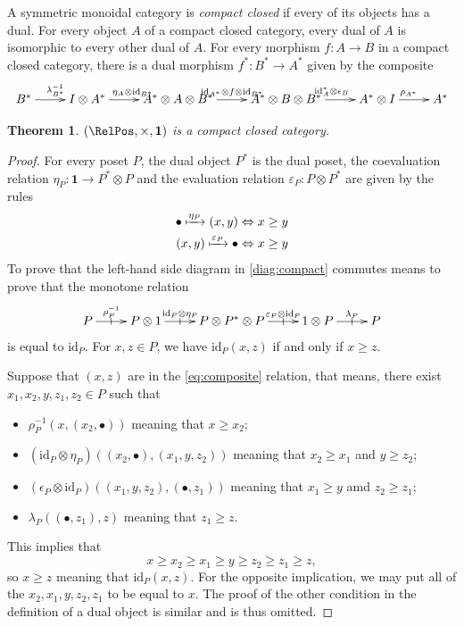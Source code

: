 \documentclass{article}
\makeatletter
\newtheorem{theorem}{Theorem}[section]
\theoremstyle{definition}
\newcommand{\id}{\mathrm{id}}
\newcommand{\sar}[2]{\ar[#1]|-@{|}^-{#2}}
\makeatother
\begin{document}
A symmetric monoidal category is {\em compact closed}
if every of its objects has a dual. For every object $A$ of a compact closed
category, every dual of $A$ is isomorphic to every other dual of $A$.
For every morphism $f\colon A\to B$ in
a compact closed category, there is a dual morphism $f^*\colon B^*\to A^*$
given by the composite
$$
\xymatrix{
B^*
	\ar[r]^{\lambda_{B^*}^{-1}}
&
I\otimes A^*
	\ar[r]^{\eta_A\otimes\id_{B^*}}
&
A^*\otimes A\otimes B^*
	\ar[r]^{\id_{A^*}\otimes f\otimes\id_{B^*}}
&
A^*\otimes B\otimes B^*
	\ar[r]^{{\id_A^*}\otimes\epsilon_B}
&
A^*\otimes I
	\ar[r]^{\rho_{A^*}}
&
A^*
}
$$

\begin{theorem}
$(\RelPos,\times,\mathbf 1)$ is a compact closed category.
\end{theorem}
\begin{proof}
For every poset $P$, the dual object $P^*$ is the dual poset, 
the coevaluation relation $\eta_P\colon\mathbf 1\to P^*\otimes P$
and the evaluation relation $\varepsilon_P\colon P\otimes P^*$ are given by
the rules
\begin{align*}
\bullet\xmapsto{\eta_P}(x,y)&\Leftrightarrow x\geq y\\
(x,y)\xmapsto{\varepsilon_P}\bullet&\Leftrightarrow x\geq y
\end{align*}
To prove that the left-hand side diagram in \eqref{diag:compact} commutes
means to prove that the monotone relation
\begin{equation}
\label{eq:composite}
\xymatrix{
P
	\sar{r}{\rho^{-1}_P}
&
P\otimes 1
	\sar{r}{\id_P\otimes\eta_P}
&
P\otimes P^*\otimes P
	\sar{r}{\varepsilon_P\otimes\id_P}
&
1\otimes P
	\sar{r}{\lambda_P}
&
P
}
\end{equation}
is equal to $\id_P$. For $x,z\in P$, we have $\id_P(x,z)$ if and only if
$x\geq z$. 

Suppose that $(x,z)$ are in the \eqref{eq:composite} relation, that means,
there exist $x_1,x_2,y,z_1,z_2\in P$ such that
\begin{itemize}
\item $\rho_P^{-1}(x,(x_2,\bullet))$ meaning that $x\geq x_2$;
\item $(\id_P\otimes\eta_P)((x_2,\bullet),(x_1,y,z_2))$ meaning that $x_2\geq x_1$
and $y\geq z_2$;
\item $(\epsilon_P\otimes\id_P)((x_1,y,z_2),(\bullet,z_1))$ meaning that $x_1\geq
y$ amd $z_2\geq z_1$;
\item $\lambda_P((\bullet,z_1),z)$ meaning that $z_1\geq z$. 
\end{itemize}
This implies that
$$
x\geq x_2\geq x_1\geq y\geq z_2\geq z_1\geq z,
$$
so $x\geq z$ meaning that $\id_P(x,z)$.
For the opposite implication,
we may put all of the $x_2,x_1,y,z_2,z_1$ to be equal to $x$. 
The proof of the other condition in the definition of a dual object
is similar and is thus omitted.
\end{proof}
\end{document}
